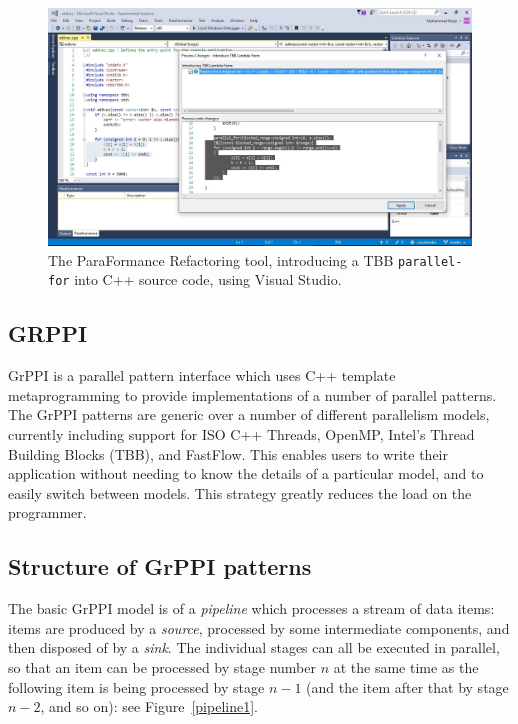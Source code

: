 \begin{figure}
    \centering
    \includegraphics[scale=0.3]{figures/TBBLambda.jpg}
    \caption{The ParaFormance Refactoring tool, introducing a TBB \texttt{parallel-for} into C++ source code, using Visual Studio.}
    \label{fig:paraformance1}
\end{figure}

\subsection{GRPPI}

GrPPI\cite{D24,DBLP:journals/concurrency/AstorgaD0G17} is a parallel pattern interface
which uses C++ template metaprogramming to provide implementations of
a number of parallel patterns.  The GrPPI patterns are generic over a
number of different parallelism models, currently including support for ISO C++ Threads, OpenMP, Intel's Thread Building Blocks (TBB), and FastFlow.  This enables users to write their application without
needing to know the details of a particular model, and to easily
switch between models.  This strategy greatly reduces the load on the programmer.


\subsection{Structure of GrPPI patterns}\label{sec:pattern-structure}

The basic GrPPI model is of a \textit{pipeline} which processes a
stream of data items: items are produced by a \textit{source},
processed by some intermediate components, and then disposed of by a
\textit{sink}. The individual stages can all be executed in parallel,
so that an item can be processed by stage number $n$ at the same time
as the following item is being processed by stage $n-1$ (and the item
after that by stage $n-2$, and so on): see Figure~\ref{pipeline1}.  

